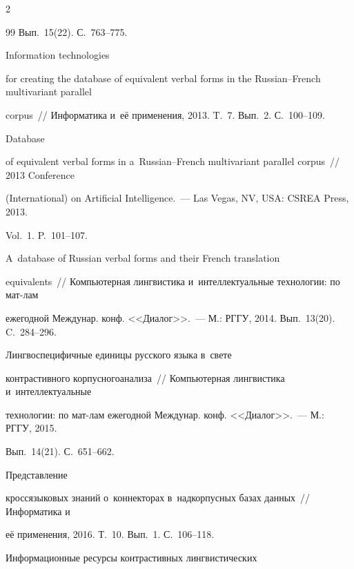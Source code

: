 \begin{multicols}{2}
{{\begin{thebibliography}{99}
Вып.~15(22). С.~763--775.


 Information technologies 

for creating the database of equivalent verbal forms in the Russian--French multivariant parallel 

corpus~// Информатика и~её применения, 2013. T.~7. Вып.~2. С.~100--109.


 Database 

of equivalent verbal forms in a~Russian--French multivariant parallel corpus~// 2013 Conference 

(International) on Artificial Intelligence.~--- Las Vegas, NV, USA: CSREA Press, 2013. 

Vol.~1. P.~101--107.


 A~database of Russian verbal forms and their French translation 

equivalents~// Компьютерная лингвистика и~интеллектуальные технологии: по мат-лам 

ежегодной Междунар. конф. <<Диалог>>.~--- М.: РГГУ, 2014. Вып.~13(20). C.~284--296.


 Лингвоспецифичные единицы русского языка в~свете 

контрастивного корпусного\linebreak анализа~// Компьютерная лингвистика и~интеллектуальные 

технологии: по мат-лам ежегодной Междунар. конф. <<Диалог>>.~--- М.: РГГУ, 2015. 

Вып.~14(21). С.~651--662.


 Представление 

кроссязыковых знаний о~коннекторах в~надкорпусных базах данных~// Информатика и~

её применения, 2016. Т.~10. Вып.~1. С.~106--118.


 Информационные ресурсы контрастивных лингвистических 


\end{thebibliography}}}
\end{multicols}
